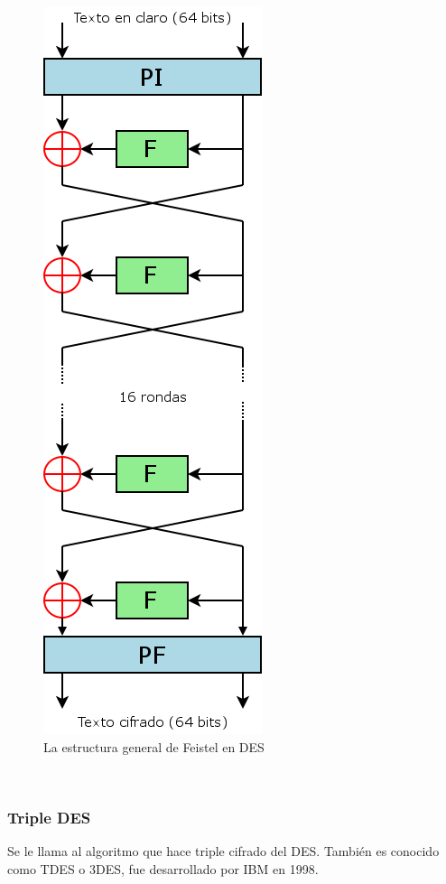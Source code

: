 \documentclass[11pt, conference]{IEEEtran}
\begin{document}
\begin{figure}[h]
	\begin{center}
		\includegraphics[scale=0.35]{DES-estructura-basica.png}
		\caption{La estructura general de Feistel en DES} 
	\end{center}
\end{figure}

\

\subsubsection{Triple DES}
Se le llama al algoritmo que hace triple cifrado del DES. También es conocido como TDES o 3DES, fue desarrollado por IBM en 1998.
\end{document}
